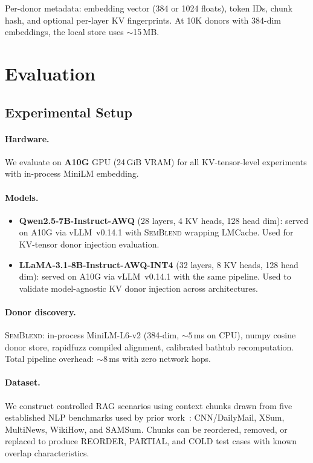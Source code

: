 \documentclass[10pt,twocolumn]{article}
\newcommand{\semblend}{\textsc{SemBlend}\xspace}
\begin{document}
Per-donor metadata: embedding vector (384 or 1024 floats), token IDs,
chunk hash, and optional per-layer KV fingerprints. At 10K donors with
384-dim embeddings, the local store uses ${\sim}$15\,MB.

\section{Evaluation}
\label{sec:eval}

\subsection{Experimental Setup}
\label{sec:setup}

\paragraph{Hardware.} We evaluate on \textbf{A10G} GPU (24\,GiB VRAM)
for all KV-tensor-level experiments with in-process MiniLM embedding.

\paragraph{Models.}
\begin{itemize}[leftmargin=*,nosep]
\item \textbf{Qwen2.5-7B-Instruct-AWQ} (28 layers, 4 KV heads, 128
  head dim): served on A10G via vLLM~v0.14.1 with \semblend
  wrapping LMCache. Used for KV-tensor donor injection evaluation.
\item \textbf{LLaMA-3.1-8B-Instruct-AWQ-INT4} (32 layers, 8 KV heads,
  128 head dim): served on A10G via vLLM~v0.14.1 with the same
  pipeline. Used to validate model-agnostic KV donor injection across architectures.
\end{itemize}

\paragraph{Donor discovery.}
\semblend: in-process MiniLM-L6-v2
(384-dim, ${\sim}5$\,ms on CPU), numpy cosine donor store,
rapidfuzz compiled alignment, calibrated bathtub recomputation.
Total pipeline overhead: ${\sim}8$\,ms with zero network hops.

\paragraph{Dataset.} We construct controlled RAG
scenarios using context chunks drawn from five established
NLP benchmarks used by prior work~\cite{semsharekv}: CNN/DailyMail,
XSum, MultiNews, WikiHow, and SAMSum. Chunks
can be reordered, removed, or replaced to produce REORDER, PARTIAL,
and COLD test cases with known overlap characteristics.
\end{document}
